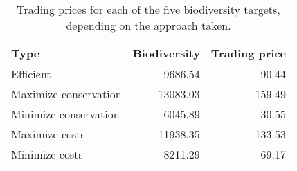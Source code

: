 \begin{table}

\caption{\label{tab:trading-prices}Trading prices for each of the five biodiversity targets, depending on the approach taken.}
\centering
\begin{tabular}[t]{l|r|r}
\hline
Type & Biodiversity & Trading price\\
\hline
Efficient & 9686.54 & 90.44\\
\hline
Maximize conservation & 13083.03 & 159.49\\
\hline
Minimize conservation & 6045.89 & 30.55\\
\hline
Maximize costs & 11938.35 & 133.53\\
\hline
Minimize costs & 8211.29 & 69.17\\
\hline
\end{tabular}
\end{table}